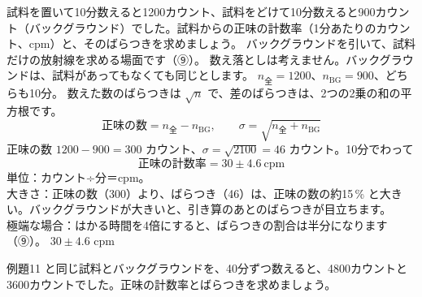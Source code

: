 \label{ph:原-12:ex11}
\begin{phreidai}[正味の計数率とばらつき]
試料を置いて10分数えると1200カウント、試料をどけて10分数えると900カウント（バックグラウンド）でした。試料からの正味の計数率（1分あたりのカウント、cpm）と、そのばらつきを求めましょう。
\phbamen
バックグラウンドを引いて、試料だけの放射線を求める場面です（⑨）。
\phmushi
数え落としは考えません。バックグラウンドは、試料があってもなくても同じとします。
\phzu
$n_{\text{全}}=1200$、$n_{\text{BG}}=900$、どちらも10分。
\phriyu
数えた数のばらつきは $\sqrt n$ で、差のばらつきは、2つの2乗の和の平方根です。
\phtateru
\[ \text{正味の数}=n_{\text{全}}-n_{\text{BG}},\qquad\sigma=\sqrt{n_{\text{全}}+n_{\text{BG}}} \]
\phtoku
正味の数 $1200-900=300$ カウント、$\sigma=\sqrt{2100}=46$ カウント。10分でわって
\[ \text{正味の計数率}=30\pm4.6\ \text{cpm} \]
\phtashikame
単位：カウント÷分＝cpm。\\
大きさ：正味の数（300）より、ばらつき（46）は、正味の数の約15\,\% と大きい。バックグラウンドが大きいと、引き算のあとのばらつきが目立ちます。\\
極端な場合：はかる時間を4倍にすると、ばらつきの割合は半分になります（⑨）。
\kotae $30\pm4.6$ cpm
\end{phreidai}
\begin{jibun}
例題11 と同じ試料とバックグラウンドを、40分ずつ数えると、4800カウントと3600カウントでした。正味の計数率とばらつきを求めましょう。
\end{jibun}

